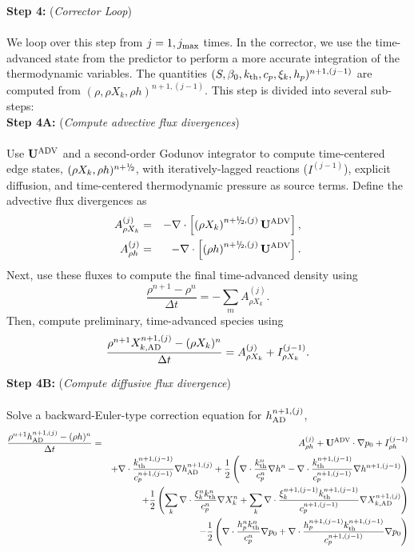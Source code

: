 {\bf Step 4:} ({\it Corrector Loop})\\ \\
We loop over this step from $j=1,j_{\rm max}$ times.  In the corrector, we use the time-advanced state from the predictor to perform a more accurate integration of the thermodynamic variables.  The quantities $(S, \beta_0, k_{\rm th}, c_p, \xi_k, h_p)^{n+1,(j-1)}$ are computed from $(\rho,\rho X_k,\rho h)^{n+1,(j-1)}$.  This step is divided into several sub-steps:\\

{\bf Step 4A:} ({\it Compute advective flux divergences})\\ \\
Use $\mathbf{U}^{\mathrm{ADV}}$ and a second-order Godunov integrator to compute time-centered edge states, $(\rho X_k, \rho h)^{n+\myhalf}$, with iteratively-lagged reactions ($I^{(j-1)}$), explicit diffusion, and time-centered thermodynamic pressure as source terms.  Define the advective flux divergences as
\begin{eqnarray}
A_{\rho X_k}^{(j)} &=& -\nabla\cdot\left[\left(\rho X_k\right)^{n+\myhalf,(j)}\uadvsdc\right],\\
A_{\rho h}^{(j)} &=& -\nabla\cdot\left[\left(\rho h\right)^{n+\myhalf,(j)}\uadvsdc\right].
\end{eqnarray}
Next, use these fluxes to compute the final time-advanced density using
\begin{equation}
\frac{\rho^{n+1} - \rho^n}{\Delta t} = -\sum_mA_{\rho X_k}^{(j)}.
\end{equation}
Then, compute preliminary, time-advanced species using
\begin{equation}
\frac{\rho^{n+1}X_{k,{\rm AD}}^{n+1,(j)} - (\rho X_k)^n}{\Delta t} = A_{\rho X_k}^{(j)} + I_{\rho X_k}^{(j-1)}.\label{eq:sdc species 3}
\end{equation}

{\bf Step 4B:} ({\it Compute diffusive flux divergence})\\ \\
Solve a backward-Euler-type correction equation for $h^{n+1,(j)}_{\rm AD}$,
\begin{eqnarray}
\frac{\rho^{n+1}h^{n+1,(j)}_{\rm AD} - (\rho h)^n}{\Delta t} &=& A_{\rho h}^{(j)} + \mathbf{U}^{\mathrm{ADV}}\cdot\nabla p_0 + I_{\rho h}^{(j-1)}\nonumber\\
&& + \nabla\cdot\frac{k_{\rm th}^{n+1,(j-1)}}{c_p^{n+1,(j-1)}}\nabla h^{n+1,(j)}_{\rm AD} + \frac{1}{2}\left(\nabla\cdot\frac{k_{\rm th}^n}{c_p^n}\nabla h^n - \nabla\cdot\frac{k_{\rm th}^{n+1,(j-1)}}{c_p^{n+1,(j-1)}}\nabla h^{n+1,(j-1)}\right)\nonumber\\
&& + \frac{1}{2}\left(\sum_k\nabla\cdot\frac{\xi_k^n k_{\rm th}^n}{c_p^n}\nabla X_k^n + \sum_k\nabla\cdot\frac{\xi_k^{n+1,(j-1)} k_{\rm th}^{n+1,(j-1)}}{c_p^{n+1,(j-1)}}\nabla X_{k,{\rm AD}}^{n+1,(j)}\right)\nonumber\\
&& - \frac{1}{2}\left(\nabla\cdot\frac{h_p^n k_{\rm th}^n}{c_p^n}\nabla p_0 + \nabla\cdot\frac{h_p^{n+1,(j-1)}k_{\rm th}^{n+1,(j-1)}}{c_p^{n+1,(j-1)}}\nabla p_0\right)\label{eq:sdc enthalpy 3}
\end{eqnarray}

